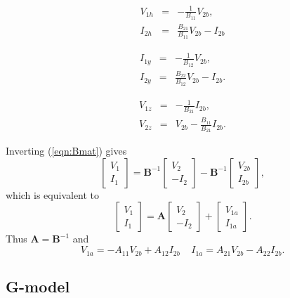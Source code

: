 \documentclass[a4paper, 12pt]{article}
\newcommand{\mat}[1]{\mathbf{#1}}
\newcommand{\bigspace}{\;\;\;\;}
\newcommand{\refeqn}[1]{\mbox{(\ref{eqn:#1})}}
\begin{document}
\begin{eqnarray}
  V_{1h} & = & -\frac{1}{B_{11}} V_{2b}, \\
  I_{2h} & = & \frac{B_{21}}{B_{11}} V_{2b} - I_{2b}
\end{eqnarray}

%
\begin{eqnarray}
  I_{1y} & = & -\frac{1}{B_{12}} V_{2b}, \\
  I_{2y} & = & \frac{B_{22}}{B_{12}} V_{2b} - I_{2b}.
\end{eqnarray}

%
\begin{eqnarray}
V_{1z} & = & -\frac{1}{B_{21}} I_{2b}, \\
V_{2z} & = & V_{2b} -\frac{B_{11}}{B_{21}} I_{2b}.
\end{eqnarray}


Inverting \refeqn{Bmat} gives
%
\begin{equation}
  \begin{bmatrix}
    V_1 \\ I_1
  \end{bmatrix}
  =
  \mat{B}^{-1}
  \begin{bmatrix}
    V_2 \\ -I_2
  \end{bmatrix}
  -
  \mat{B}^{-1}
  \begin{bmatrix}
    V_{2b} \\ I_{2b}
  \end{bmatrix},
\end{equation}
%
which is equivalent to
%
\begin{equation}
  \begin{bmatrix}
    V_1 \\ I_1
  \end{bmatrix}
  =
  \mat{A}
  \begin{bmatrix}
    V_2 \\ -I_2
  \end{bmatrix}
  +
  \begin{bmatrix}
    V_{1a} \\ I_{1a}
  \end{bmatrix}.
\end{equation}
%
Thus $\mat{A} = \mat{B}^{-1}$ and
%
\begin{equation}
V_{1a} = -A_{11} V_{2b} + A_{12} I_{2b} \bigspace I_{1a} = A_{21} V_{2b} - A_{22} I_{2b}.
\end{equation}


\subsection{G-model}
\end{document}
